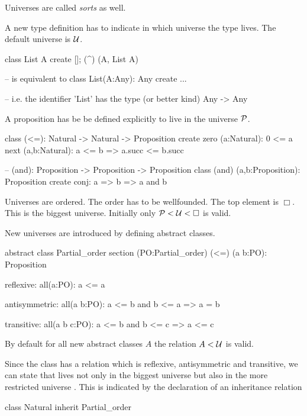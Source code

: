 Universes are called \emph{sorts} as well.

A new type definition has to indicate in which universe the type lives. The
default universe is ${\cal{U}}$.

\begin{alba}
  class List A create [];  (^) (A, List A)

  -- is equivalent to
  class List(A:Any): Any create ...

  -- i.e. the identifier 'List' has the type (or better kind)
  Any -> Any
\end{alba}

A proposition has be be defined explicitly to live in the universe ${\cal{P}}$.
%
\begin{alba}
  class
    (<=): Natural -> Natural -> Proposition
  create
    zero (a:Natural): 0 <= a
    next (a,b:Natural): a <= b => a.succ <= b.succ

  -- (and): Proposition -> Proposition -> Proposition
  class
    (and) (a,b:Proposition): Proposition
  create
    conj: a => b => a and b
\end{alba}

Universes are ordered. The order has to be wellfounded. The top element is
$\Box$. This is the biggest universe. Initially only ${\cal{P}} < {\cal{U}} < \Box$ is
valid.

New universes are introduced by defining abstract classes.
\begin{alba}
  abstract
    class Partial_order
  section (PO:Partial_order)
    (<=) (a b:PO): Proposition

    reflexive:
      all(a:PO): a <= a

    antisymmetric:
      all(a b:PO):
        a <= b  and  b <= a
        =>  a = b

    transitive:
      all(a b c:PO):
        a <= b and b <= c
        => a <= c
\end{alba}
%
By default for all new abstract classes $A$ the relation $A < {\cal{U}}$ is
valid.

Since the class  has a relation \code{<=} which is reflexive,
antisymmetric and transitive, we can state that  lives not only
in the biggest universe  but also in the more restricted universe
. This is indicated by the declaration of an
inheritance relation
%
\begin{alba}
  class Natural inherit Partial_order
\end{alba}

